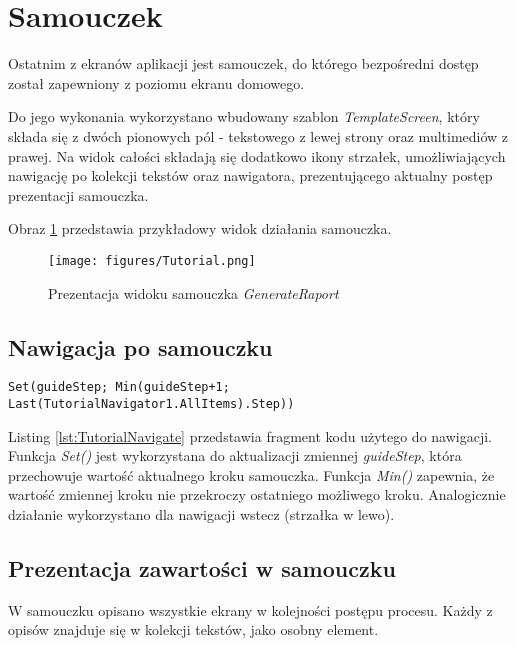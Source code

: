 \section{Samouczek}

Ostatnim z ekranów aplikacji jest samouczek, do którego bezpośredni dostęp został zapewniony z poziomu ekranu domowego.

Do jego wykonania wykorzystano wbudowany szablon \emph{TemplateScreen}, który składa się z dwóch pionowych pól - tekstowego z lewej strony oraz multimediów z prawej. Na widok całości składają się dodatkowo ikony strzałek, umożliwiających nawigację po kolekcji tekstów oraz nawigatora, prezentującego aktualny postęp prezentacji samouczka.

Obraz \ref{fig:tutorial} przedstawia przykładowy widok działania samouczka.

\begin{figure}[H]
    \centering
    \texttt{[image: figures/Tutorial.png]}
    \caption{Prezentacja widoku samouczka \emph{GenerateRaport}}
    \label{fig:tutorial}
\end{figure}

\subsection{Nawigacja po samouczku}

\begin{lstlisting}[language=PowerFx]
Set(guideStep; Min(guideStep+1; Last(TutorialNavigator1.AllItems).Step))
\end{lstlisting}

Listing \ref{lst:TutorialNavigate} przedstawia fragment kodu użytego do nawigacji. Funkcja \emph{Set()} jest wykorzystana do aktualizacji zmiennej \emph{guideStep}, która przechowuje wartość aktualnego kroku samouczka. Funkcja \emph{Min()} zapewnia, że wartość zmiennej kroku nie przekroczy ostatniego możliwego kroku.  Analogicznie działanie wykorzystano dla nawigacji wstecz (strzałka w lewo).

\subsection{Prezentacja zawartości w samouczku}

W samouczku opisano wszystkie ekrany w kolejności postępu procesu. Każdy z opisów znajduje się w kolekcji tekstów, jako osobny element.


